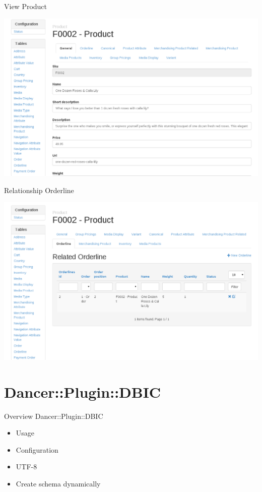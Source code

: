 \begin{frame}[plain]{View Product}
  \begin{center}
    \includegraphics[width=\textwidth,height=1\textheight,keepaspectratio]{images/product-detail.png}
  \end{center}
\end{frame}

\begin{frame}[plain]{Relationship Orderline}
  \begin{center}
    \includegraphics[width=\textwidth,height=1\textheight,keepaspectratio]{images/product-related.png}
  \end{center}
\end{frame}

\section{Dancer::Plugin::DBIC}

\begin{frame}{Overview Dancer::Plugin::DBIC}
\begin{itemize}
\item Usage
\item Configuration
\item UTF-8
\item Create schema dynamically
\end{itemize}
\end{frame}

